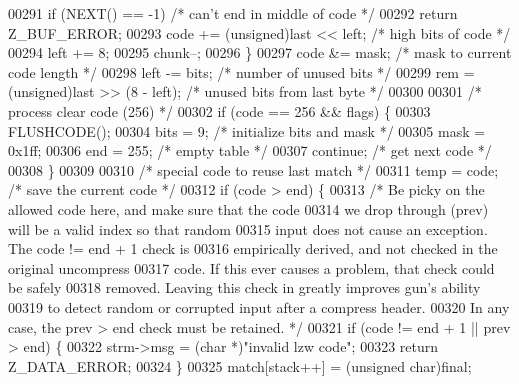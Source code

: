 \begin{DoxyCode}
00291             \textcolor{keywordflow}{if} (NEXT() == -1)               \textcolor{comment}{/* can't end in middle of code */}
00292                 \textcolor{keywordflow}{return} Z\_BUF\_ERROR;
00293             code += (unsigned)last << left; \textcolor{comment}{/* high bits of code */}
00294             left += 8;
00295             chunk--;
00296         \}
00297         code &= mask;                       \textcolor{comment}{/* mask to current code length */}
00298         left -= bits;                       \textcolor{comment}{/* number of unused bits */}
00299         rem = (unsigned)last >> (8 - left); \textcolor{comment}{/* unused bits from last byte */}
00300 
00301         \textcolor{comment}{/* process clear code (256) */}
00302         \textcolor{keywordflow}{if} (code == 256 && flags) \{
00303             FLUSHCODE();
00304             bits = 9;                       \textcolor{comment}{/* initialize bits and mask */}
00305             mask = 0x1ff;
00306             end = 255;                      \textcolor{comment}{/* empty table */}
00307             \textcolor{keywordflow}{continue};                       \textcolor{comment}{/* get next code */}
00308         \}
00309 
00310         \textcolor{comment}{/* special code to reuse last match */}
00311         temp = code;                        \textcolor{comment}{/* save the current code */}
00312         \textcolor{keywordflow}{if} (code > end) \{
00313             \textcolor{comment}{/* Be picky on the allowed code here, and make sure that the code}
00314 \textcolor{comment}{               we drop through (prev) will be a valid index so that random}
00315 \textcolor{comment}{               input does not cause an exception.  The code != end + 1 check is}
00316 \textcolor{comment}{               empirically derived, and not checked in the original uncompress}
00317 \textcolor{comment}{               code.  If this ever causes a problem, that check could be safely}
00318 \textcolor{comment}{               removed.  Leaving this check in greatly improves gun's ability}
00319 \textcolor{comment}{               to detect random or corrupted input after a compress header.}
00320 \textcolor{comment}{               In any case, the prev > end check must be retained. */}
00321             \textcolor{keywordflow}{if} (code != end + 1 || prev > end) \{
00322                 strm->msg = (\textcolor{keywordtype}{char} *)\textcolor{stringliteral}{"invalid lzw code"};
00323                 \textcolor{keywordflow}{return} Z\_DATA\_ERROR;
00324             \}
00325             match[stack++] = (\textcolor{keywordtype}{unsigned} char)\textcolor{keyword}{final};

\end{DoxyCode}
